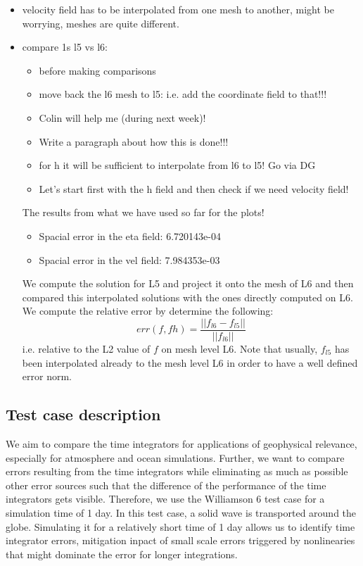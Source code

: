 \documentclass[a4paper, 12pt]{article}
\begin{document}
\begin{itemize}
 \item velocity field has to be interpolated from one mesh to another, might be worrying, meshes are quite different.
 \item compare 1s l5 vs l6:
 \begin{itemize}
  \item before making comparisons
  \item move back the l6 mesh to l5: i.e. add the coordinate field to that!!!
  \item Colin will help me (during next week)!
  \item Write a paragraph about how this is done!!!
  \item for h it will be sufficient to interpolate from l6 to l5! Go via DG
  \item Let's start first with the h field and then check if we need velocity field!
 \end{itemize}

The results from what we have used so far for the plots!
\begin{itemize}
\item Spacial error in the eta field:  6.720143e-04
\item Spacial error in the vel field:  7.984353e-03
\end{itemize}
We compute the solution for L5 and project it onto the mesh of L6 and then compared this interpolated solutions with the ones directly computed on L6. We compute the relative error by determine the following:
\begin{equation}
err(f, fh) =  \frac{||f_{l6} - f_{l5}||}{||f_{l6}||}
\end{equation}
i.e. relative to the L2 value of $f$ on mesh level L6. Note that usually, $f_{l5}$ has been interpolated
already to the mesh level L6 in order to have a well defined error norm.


\end{itemize}

\subsection{Test case description}

We aim to compare the time integrators for applications of geophysical relevance, especially for atmosphere and ocean simulations. Further, we want to compare errors resulting from the time integrators while eliminating as much as possible other error sources such that the difference of the performance of the time integrators gets visible. Therefore, we use the Williamson 6 test case for a simulation time of 1 day. In this test case, a solid wave is transported around the globe. Simulating it for a relatively short time of 1 day allows us to identify time integrator errors, mitigation inpact of small scale errors triggered by nonlinearies that might dominate the error for longer integrations.
\end{document}
